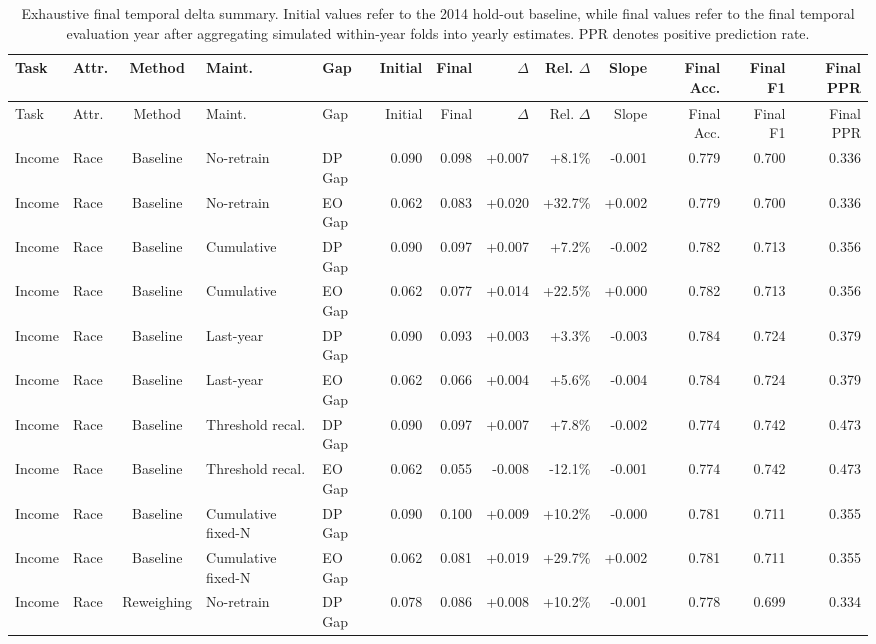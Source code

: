 \begingroup
\scriptsize
\setlength{\tabcolsep}{3pt}
\renewcommand{\arraystretch}{1.05}
\begin{longtable}{llcllrrrrrrrr}
\caption{Exhaustive final temporal delta summary. Initial values refer to the 2014 hold-out baseline, while final values refer to the final temporal evaluation year after aggregating simulated within-year folds into yearly estimates. PPR denotes positive prediction rate.}
\label{tab:final_delta_summary_full}\\
\toprule
Task & Attr. & Method & Maint. & Gap & Initial & Final & $\Delta$ & Rel. $\Delta$ & Slope & Final Acc. & Final F1 & Final PPR \\
\midrule
\endfirsthead
\toprule
Task & Attr. & Method & Maint. & Gap & Initial & Final & $\Delta$ & Rel. $\Delta$ & Slope & Final Acc. & Final F1 & Final PPR \\
\midrule
\endhead
Income & Race & Baseline & No-retrain & DP Gap & 0.090 & 0.098 & +0.007 & +8.1\% & -0.001 & 0.779 & 0.700 & 0.336 \\
Income & Race & Baseline & No-retrain & EO Gap & 0.062 & 0.083 & +0.020 & +32.7\% & +0.002 & 0.779 & 0.700 & 0.336 \\
Income & Race & Baseline & Cumulative & DP Gap & 0.090 & 0.097 & +0.007 & +7.2\% & -0.002 & 0.782 & 0.713 & 0.356 \\
Income & Race & Baseline & Cumulative & EO Gap & 0.062 & 0.077 & +0.014 & +22.5\% & +0.000 & 0.782 & 0.713 & 0.356 \\
Income & Race & Baseline & Last-year & DP Gap & 0.090 & 0.093 & +0.003 & +3.3\% & -0.003 & 0.784 & 0.724 & 0.379 \\
Income & Race & Baseline & Last-year & EO Gap & 0.062 & 0.066 & +0.004 & +5.6\% & -0.004 & 0.784 & 0.724 & 0.379 \\
Income & Race & Baseline & Threshold recal. & DP Gap & 0.090 & 0.097 & +0.007 & +7.8\% & -0.002 & 0.774 & 0.742 & 0.473 \\
Income & Race & Baseline & Threshold recal. & EO Gap & 0.062 & 0.055 & -0.008 & -12.1\% & -0.001 & 0.774 & 0.742 & 0.473 \\
Income & Race & Baseline & Cumulative fixed-N & DP Gap & 0.090 & 0.100 & +0.009 & +10.2\% & -0.000 & 0.781 & 0.711 & 0.355 \\
Income & Race & Baseline & Cumulative fixed-N & EO Gap & 0.062 & 0.081 & +0.019 & +29.7\% & +0.002 & 0.781 & 0.711 & 0.355 \\
Income & Race & Reweighing & No-retrain & DP Gap & 0.078 & 0.086 & +0.008 & +10.2\% & -0.001 & 0.778 & 0.699 & 0.334 \\

\end{longtable}
